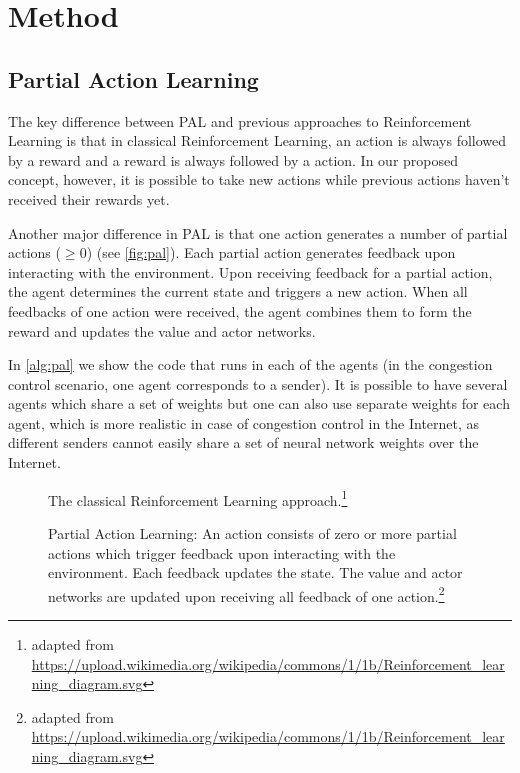 \documentclass[sigconf]{acmart}
\begin{document}
\section{Method}
\subsection{Partial Action Learning}
\label{subsec:pal}

The key difference between PAL and previous approaches to Reinforcement Learning is that in classical Reinforcement Learning, an action is always followed by a reward and a reward is always followed by a action. In our proposed concept, however, it is possible to take new actions while previous actions haven't received their rewards yet.

Another major difference in PAL is that one action generates a number of partial actions ($\geq 0$) (see \autoref{fig:pal}). Each partial action generates feedback upon interacting with the environment. Upon receiving feedback for a partial action, the agent determines the current state and triggers a new action. When all feedbacks of one action were received, the agent combines them to form the reward and updates the value and actor networks.

In \autoref{alg:pal} we show the code that runs in each of the agents (in the congestion control scenario, one agent corresponds to a sender). It is possible to have several agents which share a set of weights but one can also use separate weights for each agent, which is more realistic in case of congestion control in the Internet, as different senders cannot easily share a set of neural network weights over the Internet.

\begin{figure}
\begin{minipage}{\columnwidth}

\caption{The classical Reinforcement Learning approach.\protect\footnote{adapted from \url{https://upload.wikimedia.org/wikipedia/commons/1/1b/Reinforcement_learning_diagram.svg}}}
\label{fig:reinforcement}
\end{minipage}
\end{figure}

\begin{figure}
\begin{minipage}{\columnwidth}

\caption{Partial Action Learning: An action consists of zero or more partial actions which trigger feedback upon interacting with the environment. Each feedback updates the state. The value and actor networks are updated upon receiving all feedback of one action.\protect\footnote{adapted from \url{https://upload.wikimedia.org/wikipedia/commons/1/1b/Reinforcement_learning_diagram.svg}}}
\label{fig:pal}
\end{minipage}
\end{figure}
\end{document}
